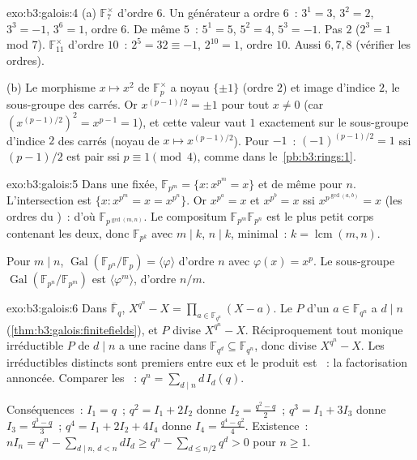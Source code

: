 \begin{solution}{exo:b3:galois:4}
(a) $\mathbb F_7^\times$ d'ordre $6$. Un générateur a ordre
$6$~: $3^1=3$, $3^2=2$, $3^3=-1$, $3^6=1$, ordre $6$. De même
$5$~: $5^1=5$, $5^2=4$, $5^3=-1$. Pas $2$ ($2^3=1$ mod $7$).
$\mathbb F_{11}^\times$ d'ordre $10$~: $2^5 = 32 \equiv -1$,
$2^{10}=1$, ordre $10$. Aussi $6, 7, 8$ (vérifier les ordres).

(b) Le morphisme $x \mapsto x^2$ de $\mathbb F_p^\times$ a
noyau $\{\pm1\}$ (ordre $2$) et image d'indice $2$, le
sous-groupe des carrés. Or $x^{(p-1)/2} = \pm1$ pour tout $x
\neq 0$ (car $(x^{(p-1)/2})^2 = x^{p-1} = 1$), et cette valeur
vaut $1$ exactement sur le sous-groupe d'indice $2$ des
carrés (noyau de $x \mapsto x^{(p-1)/2}$). Pour $-1$~:
$(-1)^{(p-1)/2} = 1$ ssi $(p-1)/2$ est pair ssi $p \equiv 1
\pmod 4$, comme dans le~\cref{pb:b3:rings:1}.
\end{solution}

\begin{solution}{exo:b3:galois:5}
Dans une  fixée, $\mathbb F_{p^m} = \{x :
x^{p^m} = x\}$ et de même pour $n$. L'intersection est $\{x :
x^{p^m} = x = x^{p^n}\}$. Or $x^{p^a} = x$ et $x^{p^b} = x$
ssi $x^{p^{\gcd(a,b)}} = x$ (les ordres du )~: d'où
$\mathbb F_{p^{\gcd(m,n)}}$. Le compositum $\mathbb
F_{p^m}\mathbb F_{p^n}$ est le plus petit corps contenant les
deux, donc $\mathbb F_{p^k}$ avec $m \mid k$, $n \mid k$,
minimal~: $k = \operatorname{lcm}(m,n)$.

Pour $m \mid n$, $\operatorname{Gal}(\mathbb F_{p^n}/\mathbb
F_p) = \langle\varphi\rangle$ d'ordre $n$ avec $\varphi(x) =
x^p$. Le sous-groupe $\operatorname{Gal}(\mathbb
F_{p^n}/\mathbb F_{p^m})$ est $\langle\varphi^m\rangle$,
d'ordre $n/m$.
\end{solution}

\begin{solution}{exo:b3:galois:6}
Dans $\overline{\mathbb F}_q$, $X^{q^n} - X = \prod_{a \in
\mathbb F_{q^n}}(X-a)$. Le  $P$ d'un $a \in
\mathbb F_{q^n}$ a  $d \mid n$
(\cref{thm:b3:galois:finitefields}), et $P$ divise $X^{q^n} -
X$. Réciproquement tout monique irréductible $P$ de  $d
\mid n$ a une racine dans $\mathbb F_{q^d} \subseteq \mathbb
F_{q^n}$, donc divise $X^{q^n}-X$. Les irréductibles distincts
sont premiers entre eux et le produit est ~: la
factorisation annoncée. Comparer les ~: $q^n =
\sum_{d\mid n} d\,I_d(q)$.

Conséquences~: $I_1 = q$~; $q^2 = I_1 + 2I_2$ donne $I_2 =
\frac{q^2-q}{2}$~; $q^3 = I_1 + 3I_3$ donne $I_3 =
\frac{q^3-q}{3}$~; $q^4 = I_1 + 2I_2 + 4I_4$ donne $I_4 =
\frac{q^4-q^2}{4}$. Existence~: $nI_n = q^n - \sum_{d\mid n,\,
d<n} dI_d \geq q^n - \sum_{d\leq n/2} q^d > 0$ pour $n \geq 1$.
\end{solution}

